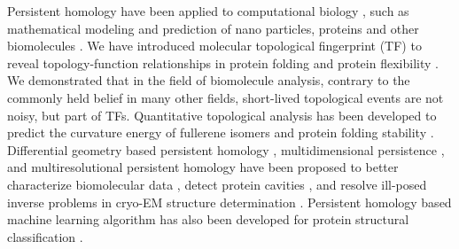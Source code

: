 \documentclass[10pt]{article}
\begin{document}

Persistent homology  have been applied to computational biology \cite{Kasson:2007,Gameiro:2014,Dabaghian:2012, Perea:2015b}, 
 such as  mathematical modeling and prediction of  nano particles, proteins and other biomolecules \cite{KLXia:2014c, KLXia:2015a,Gameiro:2014}. We have introduced molecular topological fingerprint (TF)   to reveal topology-function relationships in protein folding and protein flexibility \cite{KLXia:2014c}. We demonstrated that in the field of biomolecule analysis, contrary to the commonly held belief in many other fields, short-lived topological events are not noisy, but part of TFs. 
Quantitative topological analysis has been developed to predict the curvature energy of fullerene isomers  \cite{KLXia:2015a,BaoWang:2016a} and protein folding stability \cite{KLXia:2014c}.   Differential geometry based persistent homology  \cite{BaoWang:2016a},  
  multidimensional persistence \cite{KLXia:2015c}, and  multiresolutional persistent homology \cite{KLXia:2015e,KLXia:2015d}
	have been proposed to 	better characterize  biomolecular data  \cite{KLXia:2015c},  detect protein cavities \cite{ESES:2017},  
 and resolve ill-posed inverse problems in  cryo-EM  structure determination \cite{KLXia:2015b}. 
	Persistent homology based machine learning algorithm has also been developed for  protein structural classification  \cite{ZXCang:2015}.  
	
\end{document}
